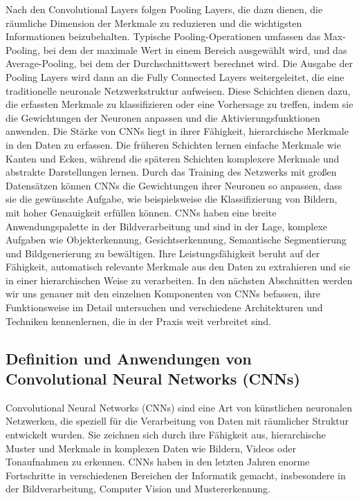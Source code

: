     Nach den Convolutional Layers folgen Pooling Layers, die dazu dienen, die räumliche Dimension der Merkmale zu reduzieren und die wichtigsten Informationen beizubehalten. 
    Typische Pooling-Operationen umfassen das Max-Pooling, bei dem der maximale Wert in einem Bereich ausgewählt wird, und das Average-Pooling, bei dem der Durchschnittswert berechnet wird.
    Die Ausgabe der Pooling Layers wird dann an die Fully Connected Layers weitergeleitet, die eine traditionelle neuronale Netzwerkstruktur aufweisen. Diese Schichten dienen dazu, die erfassten Merkmale zu klassifizieren oder eine Vorhersage zu treffen, indem sie die Gewichtungen der Neuronen anpassen und die Aktivierungsfunktionen anwenden.
    Die Stärke von CNNs liegt in ihrer Fähigkeit, hierarchische Merkmale in den Daten zu erfassen. 
    Die früheren Schichten lernen einfache Merkmale wie Kanten und Ecken, während die späteren Schichten komplexere Merkmale und abstrakte Darstellungen lernen. 
    Durch das Training des Netzwerks mit großen Datensätzen können CNNs die Gewichtungen ihrer Neuronen so anpassen, dass sie die gewünschte Aufgabe, wie beispielsweise die Klassifizierung von Bildern, mit hoher Genauigkeit erfüllen können.
    CNNs haben eine breite Anwendungspalette in der Bildverarbeitung und sind in der Lage, komplexe Aufgaben wie Objekterkennung, Gesichtserkennung, Semantische Segmentierung und Bildgenerierung zu bewältigen. 
    Ihre Leistungsfähigkeit beruht auf der Fähigkeit, automatisch relevante Merkmale aus den Daten zu extrahieren und sie in einer hierarchischen Weise zu verarbeiten.
    In den nächsten Abschnitten werden wir uns genauer mit den einzelnen Komponenten von CNNs befassen, ihre Funktionsweise im Detail untersuchen und verschiedene Architekturen und Techniken kennenlernen, die in der Praxis weit verbreitet sind.

    \subsection{Definition und Anwendungen von Convolutional Neural Networks (CNNs)}
    
        Convolutional Neural Networks (CNNs) sind eine Art von künstlichen neuronalen Netzwerken, die speziell für die Verarbeitung von Daten mit räumlicher Struktur entwickelt wurden. 
        Sie zeichnen sich durch ihre Fähigkeit aus, hierarchische Muster und Merkmale in komplexen Daten wie Bildern, Videos oder Tonaufnahmen zu erkennen. 
        CNNs haben in den letzten Jahren enorme Fortschritte in verschiedenen Bereichen der Informatik gemacht, insbesondere in der Bildverarbeitung, Computer Vision und Mustererkennung.
        
